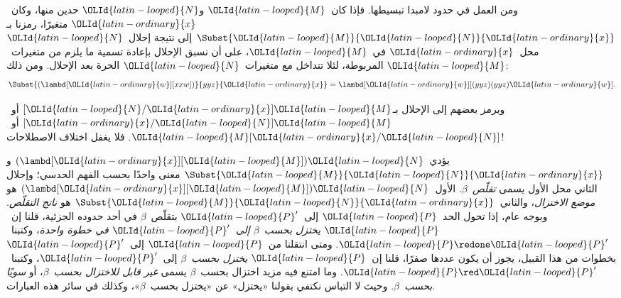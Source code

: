 \documentclass[../../../include/open-logic-section]{subfiles}
\begin{document}

ومن العمل في حدود لامبدا تبسيطها. فإذا كان~$\OLId{latin-looped}{M}$ و$\OLId{latin-looped}{N}$ حدين منها،
وكان~$\OLId{latin-ordinary}{x}$ متغيرًا، رمزنا بـ$\Subst{\OLId{latin-looped}{M}}{\OLId{latin-looped}{N}}{\OLId{latin-ordinary}{x}}$ إلى نتيجة إحلال~$\OLId{latin-looped}{N}$
محل~$\OLId{latin-ordinary}{x}$ في~$\OLId{latin-looped}{M}$، على أن نسبق الإحلال بإعادة تسمية ما يلزم من
متغيرات~$\OLId{latin-looped}{M}$ المربوطة، لئلا تتداخل مع متغيرات~$\OLId{latin-looped}{N}$ الحرة بعد
الإحلال. ومن ذلك:
\[
\Subst{(\lambd[\OLId{latin-ordinary}{w}][xxw])}{yyz}{\OLId{latin-ordinary}{x}} = \lambd[\OLId{latin-ordinary}{w}][(yyz)(yyz)\OLId{latin-ordinary}{w}].
\]

\begin{digress}
ويرمز بعضهم إلى الإحلال بـ$[\OLId{latin-looped}{N}/\OLId{latin-ordinary}{x}]\OLId{latin-looped}{M}$ أو~$[\OLId{latin-ordinary}{x}/\OLId{latin-looped}{N}]\OLId{latin-looped}{M}$ أو~$\OLId{latin-looped}{M}[\OLId{latin-ordinary}{x}/\OLId{latin-looped}{N}]$.
فلا يغفل اختلاف الاصطلاحات!
\end{digress}

يؤدي~$(\lambd[\OLId{latin-ordinary}{x}][\OLId{latin-looped}{M}])\OLId{latin-looped}{N}$ و$\Subst{\OLId{latin-looped}{M}}{\OLId{latin-looped}{N}}{\OLId{latin-ordinary}{x}}$ معنى واحدًا بحسب
الفهم الحدسي؛ وإحلال الثاني محل الأول يسمى \emph{تقلّص~$\beta$}.
الأول~$(\lambd[\OLId{latin-ordinary}{x}][\OLId{latin-looped}{M}])\OLId{latin-looped}{N}$ هو \emph{موضع الاختزال}،
والثاني~$\Subst{\OLId{latin-looped}{M}}{\OLId{latin-looped}{N}}{\OLId{latin-ordinary}{x}}$ هو \emph{ناتج التقلّص}.
وبوجه عام، إذا تحول الحد~$\OLId{latin-looped}{P}$ إلى~$\OLId{latin-looped}{P}'$ بتقلّص~$\beta$ في
أحد حدوده الجزئية، قلنا إن~$\OLId{latin-looped}{P}$ \emph{يختزل بحسب~$\beta$
إلى~$\OLId{latin-looped}{P}'$ في خطوة واحدة}، وكتبنا~$\OLId{latin-looped}{P} \redone \OLId{latin-looped}{P}'$.
ومتى انتقلنا من~$\OLId{latin-looped}{P}$ إلى~$\OLId{latin-looped}{P}'$ بخطوات من هذا القبيل،
يجوز أن يكون عددها صفرًا، قلنا إن~$\OLId{latin-looped}{P}$ \emph{يختزل بحسب~$\beta$}
إلى~$\OLId{latin-looped}{P}'$، وكتبنا~$\OLId{latin-looped}{P} \red \OLId{latin-looped}{P}'$.
وما امتنع فيه مزيد اختزال بحسب~$\beta$ يسمى
\emph{غير قابل للاختزال بحسب~$\beta$}، أو \emph{سويًا بحسب~$\beta$}.
وحيث لا التباس نكتفي بقولنا «يختزل» عن «يختزل بحسب~$\beta$»،
وكذلك في سائر هذه العبارات.
\end{document}
